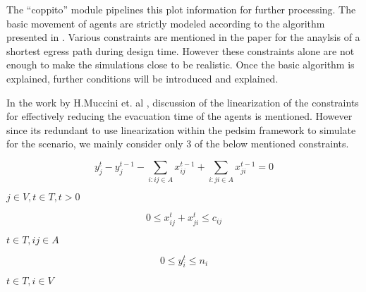 The “coppito” module pipelines this plot information for further processing. The basic movement of agents are strictly modeled according to the algorithm presented in \cite{ref5}. Various constraints are mentioned in the paper for the anaylsis of a shortest egress path during design time. However these constraints alone are not enough to make the simulations close to be realistic. Once the basic algorithm is explained, further conditions will be introduced and explained. 

In the work by H.Muccini et. al \cite{ref5}, discussion of the linearization of the constraints for effectively reducing the evacuation time of the agents is mentioned. However since its redundant to use linearization within the pedsim framework to simulate for the scenario, we mainly consider only 3 of the below mentioned constraints.

\begin{equation}
    y^t_j-y^{t-1}_j-\sum_{i:ij\in A}x^{t-1}_{ij}+\sum_{i:ji\in A}x^{t-1}_{ji}=0
\end{equation}

\hspace{100mm} $j\in V,t\in T,t>0$

\begin{equation}
  0\leq x^t_{ij}+x^t_{ji}\leq c_{ij}
\end{equation}

\hspace{100mm} $t\in T,ij\in A$

\begin{equation}
  0\leq y^t_i\leq n_i
\end{equation}

\hspace{100mm} $t\in T,i\in V$